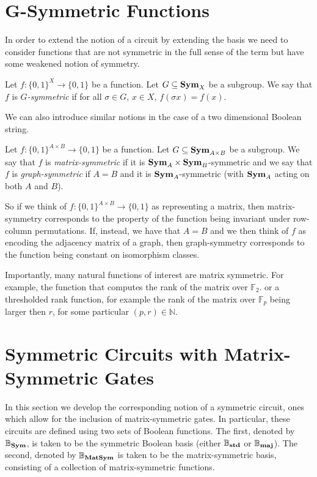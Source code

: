 \documentclass[12pt]{report}
\newcommand{\sym}{\text{\textbf{Sym}}}
\newcommand{\std}{\text{\textbf{std}}}
\newcommand{\maj}{\text{\textbf{maj}}}
\newcommand{\matsym}{\text{\textbf{MatSym}}}
\begin{document}
\section{G-Symmetric Functions}
In order to extend the notion of a circuit by extending the basis we need to
consider functions that are not symmetric in the full sense of the term but have
some weakened notion of symmetry.

\begin{definition}
  Let $f: \{0,1\}^X \rightarrow \{0,1\}$ be a function. Let $G \subseteq \sym_X$
  be a subgroup. We say that $f$ is \emph{$G$-symmetric} if for all $\sigma \in
  G$, $x \in X$, $f(\sigma x) = f(x)$.
\end{definition}

We can also introduce similar notions in the case of a two dimensional Boolean
string.

\begin{definition}
  Let $f: \{0,1\}^{A \times B} \rightarrow \{0,1\}$ be a function. Let $G
  \subseteq \sym_{A \times B}$ be a subgroup. We say that $f$ is
  \emph{matrix-symmetric} if it is $\sym_A \times \sym_B$-symmetric and we say
  that $f$ is \emph{graph-symmetric} if $A = B$ and it is $\sym_A$-symmetric
  (with $\sym_A$ acting on both $A$ and $B$).
\end{definition}

So if we think of $f: \{0,1\}^{A \times B} \rightarrow \{0,1\}$ as representing
a matrix, then matrix-symmetry corresponds to the property of the function being
invariant under row-column permutations. If, instead, we have that $A = B$ and
we then think of $f$ as encoding the adjacency matrix of a graph, then
graph-symmetry corresponds to the function being constant on isomorphism
classes.

Importantly, many natural functions of interest are matrix symmetric. For
example, the function that computes the rank of the matrix over $\mathbb{F}_2$.
or a thresholded rank function, for example the rank of the matrix over
$\mathbb{F}_p$ being larger then $r$, for some particular $(p, r) \in
\mathbb{N}$.

\section{Symmetric Circuits with Matrix-Symmetric Gates}

In this section we develop the corresponding notion of a symmetric circuit, ones
which allow for the inclusion of matrix-symmetric gates. In particular, these
circuits are defined using two sets of Boolean functions. The first, denoted by
$\mathbb{B}_\sym$, is taken to be the symmetric Boolean basis (either
$\mathbb{B}_\std$ or $\mathbb{B}_\maj$). The second, denoted by
$\mathbb{B}_\matsym$ is taken to be the matrix-symmetric basis, consisting of a
collection of matrix-symmetric functions.
\end{document}
